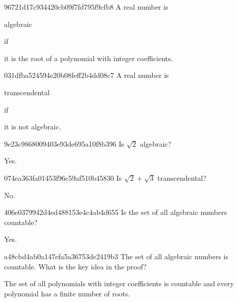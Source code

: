\begin{note}{96721d17c934420cb09f7fd795f9cfb8}
    A real number is \begin{icloze}{2}algebraic\end{icloze} if \begin{icloze}{1}it is the root of a polynomial with integer coefficients.\end{icloze}
\end{note}

\begin{note}{031dfba524594e20b08feff2b4dd08c7}
    A real number is \begin{icloze}{2}transcendental\end{icloze} if \begin{icloze}{1}it is not algebraic.\end{icloze}
\end{note}

\begin{note}{9e23c9868009403e93de695a10f8b396}
    Is \({ \sqrt{2} }\) algebraic?

    \begin{cloze}{1}
        Yes.
    \end{cloze}
\end{note}

\begin{note}{074ea363fa01453f96c59af510b45830}
    Is \({ \sqrt{2} + \sqrt{3} }\) transcendental?

    \begin{cloze}{1}
        No.
    \end{cloze}
\end{note}

\begin{note}{406e0379942d4ed488153e4c4ab4d655}
    Is the set of all algebraic numbers countable?

    \begin{cloze}{1}
        Yes.
    \end{cloze}
\end{note}

\begin{note}{a48cbd4ab0a147efa5a36753de2419b3}
    The set of all algebraic numbers is countable.
    What is the key idea in the proof?

    \begin{cloze}{1}
        The set of all polynomials with integer coefficients is countable and every polynomial has a finite number of roots.
    \end{cloze}
\end{note}

